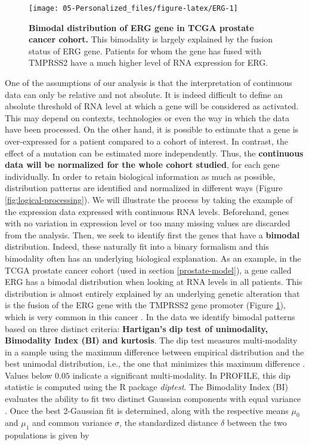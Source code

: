 \documentclass[a4paper,12pt,twoside,onecolumn,openright,final,oldfontcommands]{memoir}
\begin{document}
\begin{figure}

{\centering \texttt{[image: 05-Personalized\_files/figure-latex/ERG-1]} 

}

\caption[Bimodal distribution of ERG gene in TCGA prostate cancer cohort]{\textbf{Bimodal distribution of ERG gene in TCGA
prostate cancer cohort.} This bimodality is largely explained by the
fusion status of ERG gene. Patients for whom the gene has fused with
TMPRSS2 have a much higher level of RNA expression for ERG.}\label{fig:ERG}
\end{figure}






One of the assumptions of our analysis is that the interpretation of
continuous data can only be relative and not absolute. It is indeed
difficult to define an absolute threshold of RNA level at which a gene
will be considered as activated. This may depend on contexts,
technologies or even the way in which the data have been processed. On
the other hand, it is possible to estimate that a gene is over-expressed
for a patient compared to a cohort of interest. In contrast, the effect
of a mutation can be estimated more independently. Thus, the
\textbf{continuous data will be normalized for the whole cohort
studied}, for each gene individually. In order to retain biological
information as much as possible, distribution patterns are identified
and normalized in different ways (Figure \ref{fig:logical-processing}).
We will illustrate the process by taking the example of the expression
data expressed with continuous RNA levels. Beforehand, genes with no
variation in expression level or too many missing values are discarded
from the analysis. Then, we seek to identify first the genes that have a
\textbf{bimodal} distribution. Indeed, these naturally fit into a binary
formalism and this bimodality often has an underlying biological
explanation. As an example, in the TCGA prostate cancer cohort (used in
section \ref{prostate-model}), a gene called ERG has a bimodal
distribution when looking at RNA levels in all patients. This
distribution is almost entirely explained by an underlying genetic
alteration that is the fusion of the ERG gene with the TMPRSS2 gene
promoter (Figure \ref{fig:ERG}), which is very common in this cancer
\citep{tomlins2005recurrent}. In the data we identify bimodal patterns
based on three distinct criteria: \textbf{Hartigan's dip test of
unimodality, Bimodality Index (BI) and kurtosis}. The dip test measures
multi-modality in a sample using the maximum difference between
empirical distribution and the best unimodal distribution, i.e., the one
that minimizes this maximum difference \citep{hartigan1985dip}. Values
below \(0.05\) indicate a significant multi-modality. In PROFILE, this
dip statistic is computed using the R package \emph{diptest}. The
Bimodality Index (BI) evaluates the ability to fit two distinct Gaussian
components with equal variance \citep{wang2009bimodality}. Once the best
2-Gaussian fit is determined, along with the respective means \(\mu_0\)
and \(\mu_1\) and common variance \(\sigma\), the standardized distance
\(\delta\) between the two populations is given by
\end{document}
